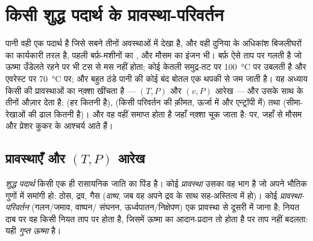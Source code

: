 \chapter{किसी शुद्ध पदार्थ के प्रावस्था-परिवर्तन}\label{ch:b1:phase-changes}

पानी वही एक पदार्थ है जिसे सबने तीनों अवस्थाओं में देखा है, और वही दुनिया
के अधिकांश बिजलीघरों का कार्यकारी तरल है, पहली बर्फ़-मशीनों का , और
मौसम का इंजन भी। बर्फ़ ऐसे ताप पर गलती है जो ऊष्मा उँडेलते रहने पर भी टस से
मस नहीं होता; कोई केतली समुद्र-तट पर \qty{100}{\degreeCelsius} पर उबलती है
और एवरेस्ट पर \qty{70}{\degreeCelsius} पर; और बहुत ठंडे पानी की कोई बंद
बोतल एक थपकी से जम जाती है। यह अध्याय किसी  की प्रावस्थाओं का
नक़्शा खींचता है --- $(T, P)$ और $(v, P)$ आरेख --- और उसके साथ के तीनों
औज़ार देता है:  (हर  कितनी है),  (किसी
परिवर्तन की क़ीमत, ऊर्जा में और एन्ट्रॉपी में) तथा  (सीमा-रेखाओं की ढाल कितनी है)। और वह वहीं समाप्त होता है जहाँ नक़्शा
चूक जाता है:  पर, जहाँ से मौसम और प्रेशर कुकर के
आश्चर्य आते हैं।

\section{प्रावस्थाएँ और $(T, P)$ आरेख}

\begin{definition}[शुद्ध पदार्थ, प्रावस्था, प्रावस्था-परिवर्तन]\label{def:b1:phase-changes:phase}
\emph{शुद्ध पदार्थ} किसी एक ही रासायनिक जाति का पिंड है। कोई
\emph{प्रावस्था} उसका वह भाग है जो अपने भौतिक गुणों में समांगी हो: ठोस,
द्रव, गैस (\emph{वाष्प}, जब वह अपने द्रव के साथ सह-अस्तित्व में हो)। कोई
\emph{प्रावस्था-परिवर्तन} (गलन/जमाव, वाष्पन/
संघनन, ऊर्ध्वपातन/निक्षेपण) एक प्रावस्था से दूसरी में जाना है; नियत दाब पर
वह किसी नियत ताप पर होता है, जिसमें ऊष्मा का आदान-प्रदान तो होता है पर ताप
नहीं बदलता: यही \emph{गुप्त ऊष्मा} है।
\end{definition}

